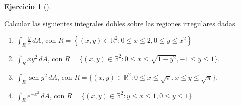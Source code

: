 \documentclass[
  spanish,
  a4paper,
]{scrreport}
\theoremstyle{definition}
\newtheorem{exercise}{Ejercicio}[chapter]
\theoremstyle{remark}
\begin{document}
\begin{exercise}[]\protect\hypertarget{exr-integrales-dobles-regiones-irregulares}{}\label{exr-integrales-dobles-regiones-irregulares}

Calcular las siguientes integrales dobles sobre las regiones irregulares
dadas.

\begin{enumerate}
\def\labelenumi{\alph{enumi}.}
\item
  \(\int_R \frac{y}{x}\,dA\), con
  \(R=\left\{(x,y)\in\mathbb{R}^2: 0\leq x\leq 2, 0\leq y\leq x^2\right\}\)
\item
  \(\int_R xy^2\,dA\), con
  \(R=\{(x,y)\in\mathbb{R}^2: 0\leq x\leq \sqrt{1-y^2}, -1\leq y\leq 1\}\).
\item
  \(\int_R \operatorname {sen}{y^2}\,dA\), con
  \(R=\{(x,y)\in\mathbb{R}^2: 0\leq x\leq \sqrt{\pi}, x\leq y\leq \sqrt{\pi}\}\).
\item
  \(\int_R e^{-x^2}\,dA\), con
  \(R=\{(x,y)\in\mathbb{R}^2: y\leq x\leq 1, 0\leq y\leq 1\}\).
\end{enumerate}

\end{exercise}
\end{document}

